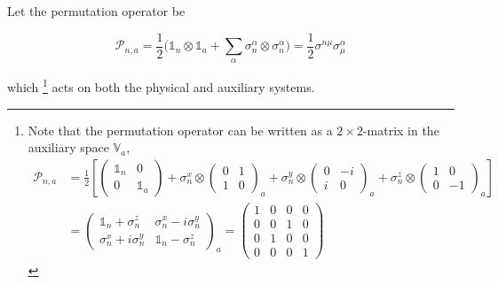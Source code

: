 \documentclass{homework}
\begin{document}
\begin{df}
    Let the permutation operator be
    
    \begin{equation}
        \bm{\mathcal P}_{n,a} = \frac{1}{2} \bigg(\mathds{1}_n \otimes \mathds{1}_a + \sum_{\alpha}\sigma_n^{\alpha}  \otimes \sigma_n^{\alpha} \bigg) = \frac{1}{2} \sigma^{n \mu}\sigma^{\alpha}_{\mu}
        \label{permutation op}
    \end{equation}
    
    which \footnote{Note that the permutation operator can be written as a $2 \times 2$-matrix in the auxiliary space $\mathds{V}_a$,
\begin{equation} 
\begin{split}
    \bm{\mathcal P}_{n,a} &= \frac{1}{2} \left[ \left(\begin{array}{cc}
        \mathds{1}_n & 0  \\
        0 & \mathds{1}_a 
    \end{array}\right) + \sigma^{x}_{n} \otimes \left(\begin{array}{cc}
        0 & 1 \\
        1 & 0
    \end{array}\right)_a + \sigma^{y}_{n} \otimes \left(\begin{array}{cc}
        0 & -i \\
        i & 0 
    \end{array}\right)_a + \sigma^{z}_{n} \otimes \left(\begin{array}{cc}
        1 & 0  \\
        0 & -1
    \end{array}\right)_a \right] \\
    &= \left(\begin{array}{cc}
       \mathds{1}_n + \sigma^{z}_{n} &  \sigma^{x}_{n} - i\sigma^{y}_{n} \\
       \sigma^{x}_{n} + i\sigma^{y}_{n}  & \mathds{1}_n - \sigma^{z}_{n}
    \end{array}\right)_a = \left(\begin{array}{cccc}
        1 & 0 & 0 & 0   \\
        0 & 0 & 1 & 0   \\
        0 & 1 & 0 & 0   \\
        0 & 0 & 0 & 1
    \end{array}\right)
    \end{split}
\end{equation}} acts on both the physical and auxiliary systems.
\end{df}
\end{document}
